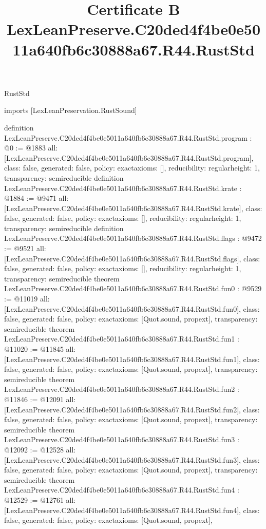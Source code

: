 \begin{lexlean}{RustStd}
\title{Certificate B LexLeanPreserve.C20ded4f4be0e5011a640fb6c30888a67.R44.RustStd}
\begin{coremodule}
imports [LexLeanPreservation.RustSound]

definition LexLeanPreserve.C20ded4f4be0e5011a640fb6c30888a67.R44.RustStd.program : @0 := @1883 {
  all: [LexLeanPreserve.C20ded4f4be0e5011a640fb6c30888a67.R44.RustStd.program],
  class: false,
  generated: false,
  policy: exact{axioms: []},
  reducibility: regular{height: 1},
  transparency: semireducible
}
definition LexLeanPreserve.C20ded4f4be0e5011a640fb6c30888a67.R44.RustStd.krate : @1884 := @9471 {
  all: [LexLeanPreserve.C20ded4f4be0e5011a640fb6c30888a67.R44.RustStd.krate],
  class: false,
  generated: false,
  policy: exact{axioms: []},
  reducibility: regular{height: 1},
  transparency: semireducible
}
definition LexLeanPreserve.C20ded4f4be0e5011a640fb6c30888a67.R44.RustStd.flags : @9472 := @9521 {
  all: [LexLeanPreserve.C20ded4f4be0e5011a640fb6c30888a67.R44.RustStd.flags],
  class: false,
  generated: false,
  policy: exact{axioms: []},
  reducibility: regular{height: 1},
  transparency: semireducible
}
theorem LexLeanPreserve.C20ded4f4be0e5011a640fb6c30888a67.R44.RustStd.fun0 : @9529 := @11019 {
  all: [LexLeanPreserve.C20ded4f4be0e5011a640fb6c30888a67.R44.RustStd.fun0],
  class: false,
  generated: false,
  policy: exact{axioms: [Quot.sound, propext]},
  transparency: semireducible
}
theorem LexLeanPreserve.C20ded4f4be0e5011a640fb6c30888a67.R44.RustStd.fun1 : @11020 := @11845 {
  all: [LexLeanPreserve.C20ded4f4be0e5011a640fb6c30888a67.R44.RustStd.fun1],
  class: false,
  generated: false,
  policy: exact{axioms: [Quot.sound, propext]},
  transparency: semireducible
}
theorem LexLeanPreserve.C20ded4f4be0e5011a640fb6c30888a67.R44.RustStd.fun2 : @11846 := @12091 {
  all: [LexLeanPreserve.C20ded4f4be0e5011a640fb6c30888a67.R44.RustStd.fun2],
  class: false,
  generated: false,
  policy: exact{axioms: [Quot.sound, propext]},
  transparency: semireducible
}
theorem LexLeanPreserve.C20ded4f4be0e5011a640fb6c30888a67.R44.RustStd.fun3 : @12092 := @12528 {
  all: [LexLeanPreserve.C20ded4f4be0e5011a640fb6c30888a67.R44.RustStd.fun3],
  class: false,
  generated: false,
  policy: exact{axioms: [Quot.sound, propext]},
  transparency: semireducible
}
theorem LexLeanPreserve.C20ded4f4be0e5011a640fb6c30888a67.R44.RustStd.fun4 : @12529 := @12761 {
  all: [LexLeanPreserve.C20ded4f4be0e5011a640fb6c30888a67.R44.RustStd.fun4],
  class: false,
  generated: false,
  policy: exact{axioms: [Quot.sound, propext]},
}
\end{coremodule}
\end{lexlean}

